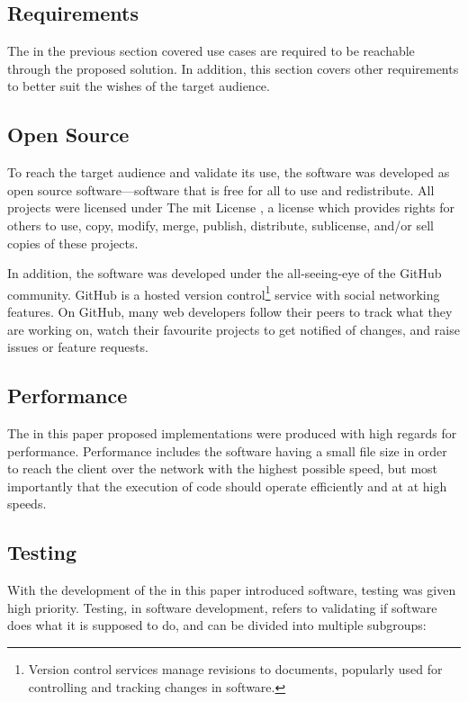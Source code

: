 \begin{enumerate}
\section{Requirements}\label{requirements}

The in the previous section covered use cases are required to be
reachable through the proposed solution. In addition, this section
covers other requirements to better suit the wishes of the target
audience.

\subsection{Open Source}\label{open-source}

To reach the target audience and validate its use, the software was
developed as open source software---software that is free for all to use
and redistribute. All projects were licensed under The \acrshort{mit}
License \autocite{opensource.org-licenses-mit}, a license which provides
rights for others to use, copy, modify, merge, publish, distribute,
sublicense, and\slash or sell copies of these projects.

In addition, the software was developed under the all-seeing-eye of the
GitHub community. GitHub is a hosted version control\footnote{Version
  control services manage revisions to documents, popularly used for
  controlling and tracking changes in software.} service with social
networking features. On GitHub, many web developers follow their peers
to track what they are working on, watch their favourite projects to get
notified of changes, and raise issues or feature requests.

\subsection{Performance}\label{performance}

The in this paper proposed implementations were produced with high
regards for performance. Performance includes the software having a
small file size in order to reach the client over the network with the
highest possible speed, but most importantly that the execution of code
should operate efficiently and at at high speeds.

\subsection{Testing}\label{testing}

With the development of the in this paper introduced software, testing
was given high priority. Testing, in software development, refers to
validating if software does what it is supposed to do, and can be
divided into multiple subgroups:


\end{enumerate}
